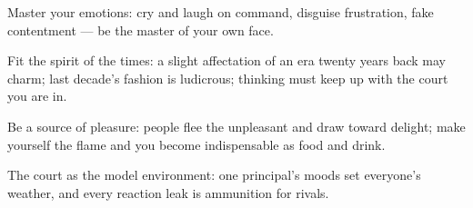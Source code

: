 

\begin{distilled}
  \item Master your emotions: cry and laugh on command, disguise frustration, fake contentment --- be the master of your own face.
  \item Fit the spirit of the times: a slight affectation of an era twenty years back may charm; last decade's fashion is ludicrous; thinking must keep up with the court you are in.
  \item Be a source of pleasure: people flee the unpleasant and draw toward delight; make yourself the flame and you become indispensable as food and drink.
  \item The court as the model environment: one principal's moods set everyone's weather, and every reaction leak is ammunition for rivals.
\end{distilled}
